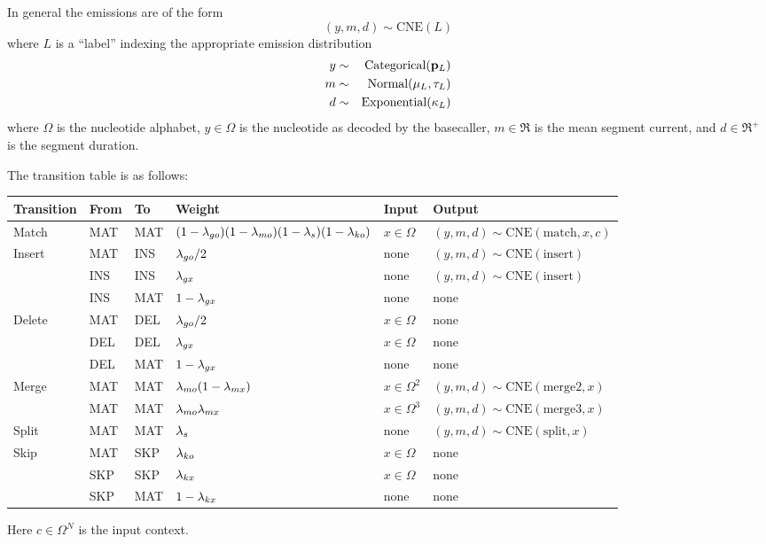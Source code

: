 \documentclass[10pt]{article}
\begin{document}
In general the emissions are of the form
\[
(y,m,d) \sim \mbox{CNE}(L)
\]
where $L$ is a ``label'' indexing the appropriate emission distribution
\begin{eqnarray*}
y & \sim & \mbox{Categorical}({\bf p}_L)
\\
m & \sim & \mbox{Normal}(\mu_L,\tau_L)
\\
d & \sim & \mbox{Exponential}(\kappa_L)
\end{eqnarray*}
where $\Omega$ is the nucleotide alphabet,
$y \in \Omega$ is the nucleotide as decoded by the basecaller,
$m \in \Re$ is the mean segment current, and
$d \in \Re^+$ is the segment duration.

The transition table is as follows:

\begin{tabular}{llllll}
Transition & From & To & Weight & Input & Output
\\
\hline
Match & MAT & MAT & $(1-\lambda_{go})(1-\lambda_{mo})(1-\lambda_s)(1-\lambda_{ko})$ & $x \in \Omega$ &
$(y,m,d) \sim \mbox{CNE}(\mbox{match},x,c)$
\\
Insert & MAT & INS & $\lambda_{go}/2$ & none & $(y,m,d) \sim \mbox{CNE}(\mbox{insert})$ \\
       & INS & INS & $\lambda_{gx}$ & none & $(y,m,d) \sim \mbox{CNE}(\mbox{insert})$ \\
       & INS & MAT & $1 - \lambda_{gx}$ & none & none \\
Delete & MAT & DEL & $\lambda_{go}/2$ & $x \in \Omega$ & none \\
       & DEL & DEL & $\lambda_{gx}$ & $x \in \Omega$ & none \\
       & DEL & MAT & $1 - \lambda_{gx}$ & none & none \\
Merge & MAT & MAT & $\lambda_{mo}(1-\lambda_{mx})$ & $x \in \Omega^2$ & $(y,m,d) \sim \mbox{CNE}(\mbox{merge2},x)$ \\
      & MAT & MAT & $\lambda_{mo}\lambda_{mx}$ & $x \in \Omega^3$ & $(y,m,d) \sim \mbox{CNE}(\mbox{merge3},x)$ \\
Split & MAT & MAT & $\lambda_s$ & none & $(y,m,d) \sim \mbox{CNE}(\mbox{split},x)$ \\
Skip & MAT & SKP & $\lambda_{ko}$ & $x \in \Omega$ & none \\
     & SKP & SKP & $\lambda_{kx}$ & $x \in \Omega$ & none \\
     & SKP & MAT & $1 - \lambda_{kx}$ & none & none
\end{tabular}

Here $c \in \Omega^N$ is the input context.
\end{document}
